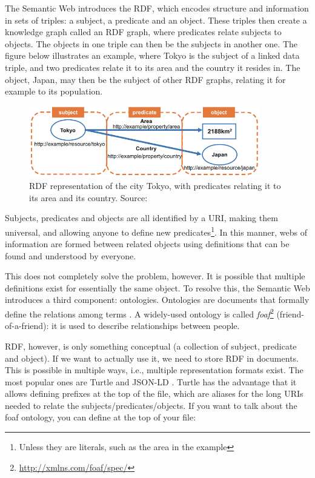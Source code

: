 \noindent The Semantic Web introduces the \gls{RDF}, which encodes structure and information in sets of triples: a subject, a predicate and an object. These triples then create a knowledge graph called an RDF graph, where predicates relate subjects to objects. The objects in one triple can then be the subjects in another one. The figure below illustrates an example, where Tokyo is the subject of a linked data triple, and two predicates relate it to its area and the country it resides in. The object, Japan, may then be the subject of other RDF graphs, relating it for example to its population.

\begin{figure}[H]
    \centering
    \includegraphics[width = 0.9\textwidth]{images/background/linked-data.png}
    \caption{\gls{RDF} representation of the city Tokyo, with predicates relating it to its area and its country. Source: \citet{generating-pva}}
    \label{fig:linked-data}
\end{figure}

\noindent Subjects, predicates and objects are all identified by a URI, making them universal, and allowing anyone to define new predicates\footnote{Unless they are literals, such as the area in the example}. In this manner, webs of information are formed between related objects using definitions that can be found and understood by everyone.

This does not completely solve the problem, however. It is possible that multiple definitions exist for essentially the same object. To resolve this, the Semantic Web introduces a third component: ontologies. Ontologies are documents that formally define the relations among terms \citep{semantic-web}. A widely-used ontology is called \textit{foaf}\footnote{\url{ http://xmlns.com/foaf/spec/}} (friend-of-a-friend): it is used to describe relationships between people.

\gls{RDF}, however, is only something conceptual (a collection of subject, predicate and object). If we want to actually use it, we need to store \gls{RDF} in documents. This is possible in multiple ways, i.e., multiple representation formats exist. The most popular ones are Turtle \citep{turtle} and JSON-LD \citep{jsonld}. Turtle has the advantage that it allows defining prefixes at the top of the file, which are aliases for the long URIs needed to relate the subjects/predicates/objects. If you want to talk about the foaf ontology, you can define at the top of your file:

